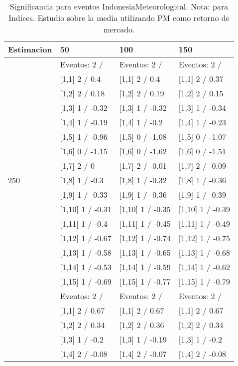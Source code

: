 \begin{table}

\caption{Significancia para eventos IndonesiaMeteorological. Nota: para Indices. Estudio sobre la media utilizando PM como retorno de mercado.}
\centering
\begin{tabular}[t]{llll}
\toprule
Estimacion & 50 & 100 & 150\\
\midrule
 & Eventos:  2 / & Eventos:  2 / & Eventos:  2 /\\
 & {}[1,1] 2  / 0.4 & {}[1,1] 2  / 0.4 & {}[1,1] 2  / 0.37\\
 & {}[1,2] 2  / 0.18 & {}[1,2] 2  / 0.19 & {}[1,2] 2  / 0.15\\
 & {}[1,3] 1  / -0.32 & {}[1,3] 1  / -0.32 & {}[1,3] 1  / -0.34\\
 & {}[1,4] 1  / -0.19 & {}[1,4] 1  / -0.2 & {}[1,4] 1  / -0.23\\
\addlinespace
 & {}[1,5] 1  / -0.96 & {}[1,5] 0  / -1.08 & {}[1,5] 0  / -1.07\\
 & {}[1,6] 0  / -1.15 & {}[1,6] 0  / -1.62 & {}[1,6] 0  / -1.51\\
 & {}[1,7] 2  / 0 & {}[1,7] 2  / -0.01 & {}[1,7] 2  / -0.09\\
250 & {}[1,8] 1  / -0.3 & {}[1,8] 1  / -0.32 & {}[1,8] 1  / -0.36\\
 & {}[1,9] 1  / -0.33 & {}[1,9] 1  / -0.36 & {}[1,9] 1  / -0.39\\
\addlinespace
 & {}[1,10] 1  / -0.31 & {}[1,10] 1  / -0.35 & {}[1,10] 1  / -0.39\\
 & {}[1,11] 1  / -0.4 & {}[1,11] 1  / -0.45 & {}[1,11] 1  / -0.49\\
 & {}[1,12] 1  / -0.67 & {}[1,12] 1  / -0.74 & {}[1,12] 1  / -0.75\\
 & {}[1,13] 1  / -0.58 & {}[1,13] 1  / -0.65 & {}[1,13] 1  / -0.68\\
 & {}[1,14] 1  / -0.53 & {}[1,14] 1  / -0.59 & {}[1,14] 1  / -0.62\\
\addlinespace
 & {}[1,15] 1  / -0.69 & {}[1,15] 1  / -0.77 & {}[1,15] 1  / -0.79\\
 & Eventos:  2 / & Eventos:  2 / & Eventos:  2 /\\
 & {}[1,1] 2  / 0.67 & {}[1,1] 2  / 0.67 & {}[1,1] 2  / 0.67\\
 & {}[1,2] 2  / 0.34 & {}[1,2] 2  / 0.36 & {}[1,2] 2  / 0.34\\
 & {}[1,3] 1  / -0.2 & {}[1,3] 1  / -0.19 & {}[1,3] 1  / -0.2\\
\addlinespace
 & {}[1,4] 2  / -0.08 & {}[1,4] 2  / -0.07 & {}[1,4] 2  / -0.08\\

\end{tabular}
\end{table}
